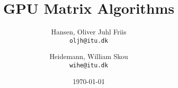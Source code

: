 \usepackage{graphicx}
\usepackage{float}
\usepackage{caption}
\usepackage{url}
\usepackage{enumitem}
\usepackage{amsmath} %
\usepackage{wrapfig} %
\usepackage[utf8]{inputenc}
\usepackage{fancyvrb}
\usepackage{listings}

\usepackage{hyperref}
\hypersetup{
    colorlinks=true,
    linkcolor=blue,
    filecolor=magenta,      
    urlcolor=cyan,
}

\title{GPU Matrix Algorithms}
\author{
Hansen, Oliver Juhl Friis\\
\texttt{oljh@itu.dk}
\and
Heidemann, William Skou\\
\texttt{wihe@itu.dk}
}
\date{\today}
